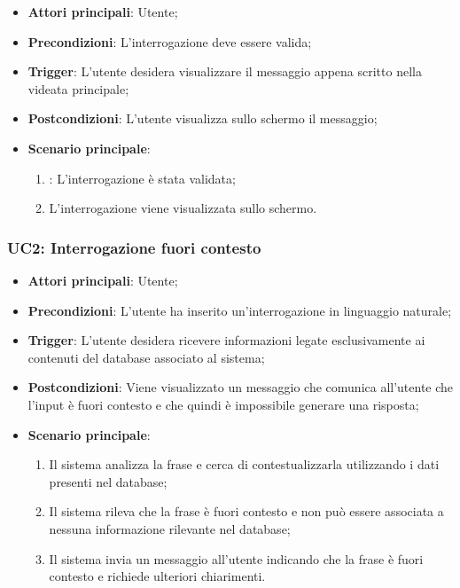 \hypertarget{UC1.4}{}
\begin{itemize}
    \item \textbf{Attori principali}: Utente;
    \item \textbf{Precondizioni}: L'interrogazione deve essere valida;
    \item \textbf{Trigger}: L'utente desidera visualizzare il messaggio appena scritto nella videata principale;
    \item \textbf{Postcondizioni}: L'utente visualizza sullo schermo il messaggio;
    \item \textbf{Scenario principale}:
    \begin{enumerate}
        \item {}: L'interrogazione è stata validata;
        \item L'interrogazione viene visualizzata sullo schermo.
    \end{enumerate}
\end{itemize}


\hypertarget{UC2}{}
\subsubsection{UC2: Interrogazione fuori contesto}

\begin{itemize}
    \item \textbf{Attori principali}: Utente;
    \item \textbf{Precondizioni}: L'utente ha inserito un'interrogazione in linguaggio naturale;
    \item \textbf{Trigger}: L'utente desidera ricevere informazioni legate esclusivamente ai contenuti del database associato al sistema;
    \item \textbf{Postcondizioni}: Viene visualizzato un messaggio che comunica all'utente che l'input è fuori contesto e che quindi è impossibile generare una risposta;
    \item \textbf{Scenario principale}:
    \begin{enumerate}
        \item Il sistema analizza la frase e cerca di contestualizzarla utilizzando i dati presenti nel database;
        \item Il sistema rileva che la frase è fuori contesto e non può essere associata a nessuna informazione rilevante nel database;
        \item Il sistema invia un messaggio all'utente indicando che la frase è fuori contesto e richiede ulteriori chiarimenti.
    \end{enumerate}
\end{itemize}
\newpage


